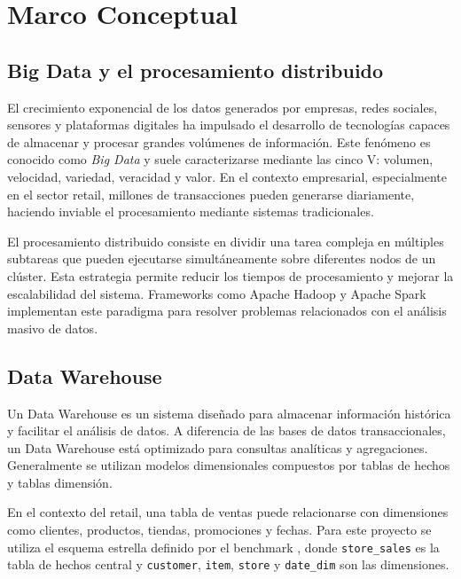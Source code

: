 
\section{Marco Conceptual}

\subsection{Big Data y el procesamiento distribuido}

El crecimiento exponencial de los datos generados por empresas, redes sociales, sensores
y plataformas digitales ha impulsado el desarrollo de tecnologías capaces de almacenar
y procesar grandes volúmenes de información. Este fenómeno es conocido como \textit{Big Data}
y suele caracterizarse mediante las cinco V: volumen, velocidad, variedad, veracidad y valor.
En el contexto empresarial, especialmente en el sector retail, millones de transacciones pueden
generarse diariamente, haciendo inviable el procesamiento mediante sistemas tradicionales.

El procesamiento distribuido consiste en dividir una tarea compleja en múltiples subtareas
que pueden ejecutarse simultáneamente sobre diferentes nodos de un clúster. Esta estrategia
permite reducir los tiempos de procesamiento y mejorar la escalabilidad del sistema.
Frameworks como Apache Hadoop y Apache Spark implementan este paradigma para resolver
problemas relacionados con el análisis masivo de datos.

\subsection{Data Warehouse}

Un Data Warehouse es un sistema diseñado para almacenar información histórica y facilitar
el análisis de datos. A diferencia de las bases de datos transaccionales, un Data Warehouse
está optimizado para consultas analíticas y agregaciones. Generalmente se utilizan modelos
dimensionales compuestos por tablas de hechos y tablas dimensión.

En el contexto del retail, una tabla de ventas puede relacionarse con dimensiones como
clientes, productos, tiendas, promociones y fechas. Para este proyecto se utiliza el
esquema estrella definido por el benchmark \tpcds{}, donde \texttt{store\_sales} es la
tabla de hechos central y \texttt{customer}, \texttt{item}, \texttt{store} y
\texttt{date\_dim} son las dimensiones.

